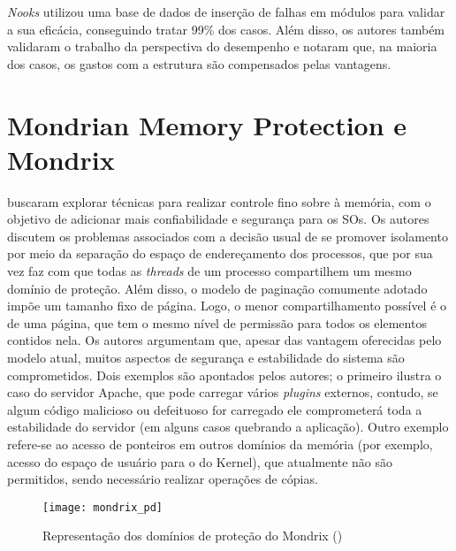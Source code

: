 \emph{Nooks} utilizou uma base de dados de inserção de falhas em módulos para
validar a sua eficácia, conseguindo tratar 99\% dos casos. Além disso, os
autores também validaram o trabalho da perspectiva do desempenho e notaram que,
na maioria dos casos, os gastos com a estrutura são compensados pelas vantagens.

\section{Mondrian Memory Protection e Mondrix}

\citet{mmp} buscaram explorar técnicas para realizar controle fino sobre à
memória, com o objetivo de adicionar mais confiabilidade e segurança para os
SOs. Os autores discutem os problemas associados com a decisão usual de se promover
isolamento por meio da separação do espaço de endereçamento dos processos, que
por sua vez faz com que todas as \emph{threads} de um processo compartilhem um
mesmo domínio de proteção. Além disso, o modelo de paginação comumente adotado impõe um
tamanho fixo de página. Logo, o menor compartilhamento possível é o de uma página, que
tem o mesmo nível de permissão para todos os elementos contidos nela. Os autores
argumentam que, apesar das vantagem oferecidas pelo modelo atual, muitos
aspectos de segurança e estabilidade do sistema são comprometidos. Dois
exemplos são apontados pelos autores; o primeiro ilustra o caso do servidor
Apache, que pode carregar vários \textit{plugins} externos, contudo, se algum
código malicioso ou defeituoso for carregado ele comprometerá toda a
estabilidade do servidor (em alguns casos quebrando a aplicação). Outro exemplo
refere-se ao acesso de ponteiros em outros domínios da memória (por exemplo,
acesso do espaço de usuário para o do Kernel), que atualmente não são permitidos,
sendo necessário realizar operações de cópias.

\begin{figure}[!h]
  \centering
  \texttt{[image: mondrix\_pd]}
	\caption[Representação dos domínios de proteção do Mondrix]{Representação dos domínios de proteção do Mondrix (\cite{mondrix})}
  \label{fig:mondrixPD} 
\end{figure}


